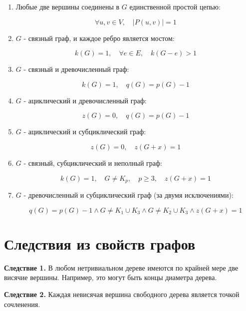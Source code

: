 {\begin{enumerate}
  \item Любые две вершины соединены в $G$ единственной простой цепью:  
  

\[
  \forall u, v \in V,\quad |P(u, v)| = 1
  \]



  \item $G$ - связный граф, и каждое ребро является мостом:  
  

\[
  k(G) = 1,\quad \forall e \in E,\quad k(G - e) > 1
  \]



  \item $G$ - связный и древочисленный граф:  
  

\[
  k(G) = 1,\quad q(G) = p(G) - 1
  \]



  \item $G$ - ациклический и древочисленный граф:  
  

\[
  z(G) = 0,\quad q(G) = p(G) - 1
  \]



  \item $G$ - ациклический и субциклический граф:  
  

\[
  z(G) = 0,\quad z(G + x) = 1
  \]



  \item $G$ - связный, субциклический и неполный граф:  
  

\[
  k(G) = 1,\quad G \ne K_p,\quad p \ge 3,\quad z(G + x) = 1
  \]



  \item $G$ - древочисленный и субциклический граф (за двумя исключениями):  
  

\[
  q(G) = p(G) - 1 \land G \ne K_1 \cup K_3 \land G \ne K_2 \cup K_3 \land z(G + x) = 1
  \]


\end{enumerate}

\section*{Следствия из свойств графов}

\textbf{Следствие 1.}  
В любом нетривиальном дереве имеются по крайней мере две висячие вершины.  
Например, это могут быть концы диаметра дерева.

\vspace{1em}

\textbf{Следствие 2.}  
Каждая невисячая вершина свободного дерева является точкой сочленения.

}
